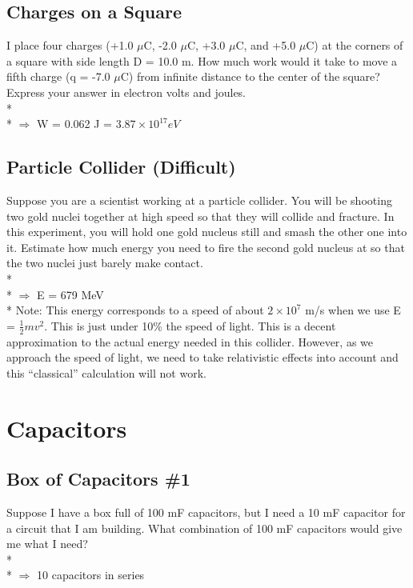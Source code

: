 \documentclass[11pt]{article}
\begin{document}
\subsection{Charges on a Square}
I place four charges (+1.0 $\mu$C, -2.0 $\mu$C, +3.0 $\mu$C, and +5.0 $\mu$C) at the corners of a square with side length D = 10.0 m.  How much work would it take to move a fifth charge (q = -7.0 $\mu$C) from infinite distance to the center of the square?  Express your answer in electron volts and joules.\\* \\*
$\Rightarrow$ W = 0.062 J = $3.87 \times 10^{17} eV$

\subsection{Particle Collider (Difficult)}
Suppose you are a scientist working at a particle collider.  You will be shooting two gold nuclei together at high speed so that they will collide and fracture.  In this experiment, you will hold one gold nucleus still and smash the other one into it.  Estimate how much energy you need to fire the second gold nucleus at so that the two nuclei just barely make contact.\\*\\*
$\Rightarrow$ E = 679 MeV\\*
Note: This energy corresponds to a speed of about $2\times 10^7$ m/s when we use E = $\frac{1}{2}mv^2$.  This is just under 10\% the speed of light.  This is a decent approximation to the actual energy needed in this collider.  However, as we approach the speed of light, we need to take relativistic effects into account and this ``classical'' calculation will not work.


\pagebreak
\section{Capacitors}
\vspace{10pt}

\subsection{Box of Capacitors \#1}
Suppose I have a box full of 100 mF capacitors, but I need a 10 mF capacitor for a circuit that I am building.  What combination of 100 mF capacitors would give me what I need?\\* \\*
$\Rightarrow$ 10 capacitors in series
\end{document}

